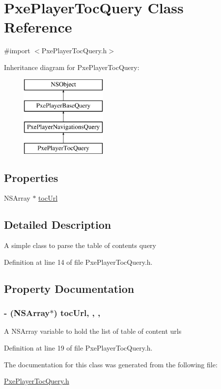\hypertarget{interface_pxe_player_toc_query}{\section{Pxe\-Player\-Toc\-Query Class Reference}
\label{interface_pxe_player_toc_query}
}


{\ttfamily \#import $<$Pxe\-Player\-Toc\-Query.\-h$>$}

Inheritance diagram for Pxe\-Player\-Toc\-Query\-:\begin{figure}[H]
\begin{center}
\leavevmode
\includegraphics[height=4.000000cm]{interface_pxe_player_toc_query}
\end{center}
\end{figure}
\subsection*{Properties}
\begin{DoxyCompactItemize}
\item 
N\-S\-Array $\ast$ \hyperlink{interface_pxe_player_toc_query_aec89353d8d0f6f2f745e81162fe27a52}{toc\-Url}
\end{DoxyCompactItemize}


\subsection{Detailed Description}
A simple class to parse the table of contents query 

Definition at line 14 of file Pxe\-Player\-Toc\-Query.\-h.



\subsection{Property Documentation}
\hypertarget{interface_pxe_player_toc_query_aec89353d8d0f6f2f745e81162fe27a52}{
\subsubsection[{toc\-Url}]{\setlength{\rightskip}{0pt plus 5cm}-\/ (N\-S\-Array$\ast$) toc\-Url\hspace{0.3cm}{\ttfamily [read]}, {\ttfamily [write]}, {\ttfamily [nonatomic]}, {\ttfamily [strong]}}}\label{interface_pxe_player_toc_query_aec89353d8d0f6f2f745e81162fe27a52}
A N\-S\-Array variable to hold the list of table of content urls 

Definition at line 19 of file Pxe\-Player\-Toc\-Query.\-h.



The documentation for this class was generated from the following file\-:\begin{DoxyCompactItemize}
\item 
\hyperlink{_pxe_player_toc_query_8h}{Pxe\-Player\-Toc\-Query.\-h}\end{DoxyCompactItemize}
